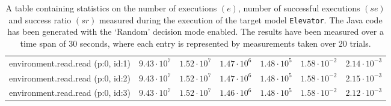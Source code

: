\begin{table}[htbp]
{\begin{tabular}{lrrrrrr}
\hspace{3mm}environment.read.read (p:0, id:1) & $9.43 \cdot 10^{7}$ & $1.52 \cdot 10^{7}$ & $1.47 \cdot 10^{6}$ & $1.48 \cdot 10^{5}$ & $1.58 \cdot 10^{-2}$ & $2.14 \cdot 10^{-3}$ \\
\hspace{3mm}environment.read.read (p:0, id:2) & $9.43 \cdot 10^{7}$ & $1.52 \cdot 10^{7}$ & $1.47 \cdot 10^{6}$ & $1.48 \cdot 10^{5}$ & $1.58 \cdot 10^{-2}$ & $2.15 \cdot 10^{-3}$ \\
\hspace{3mm}environment.read.read (p:0, id:3) & $9.43 \cdot 10^{7}$ & $1.52 \cdot 10^{7}$ & $1.46 \cdot 10^{6}$ & $1.48 \cdot 10^{5}$ & $1.58 \cdot 10^{-2}$ & $2.12 \cdot 10^{-3}$ \\
\bottomrule
\end{tabular}
}
\caption{A table containing statistics on the number of executions $(e)$, number of successful executions $(se)$ and success ratio $(sr)$ measured during the execution of the target model \texttt{Elevator}. The Java code has been generated with the `Random' decision mode enabled. The results have been measured over a time span of 30 seconds, where each entry is represented by measurements taken over 20 trials.}
\label{table:frequency_results_elevator_random}
\end{table}